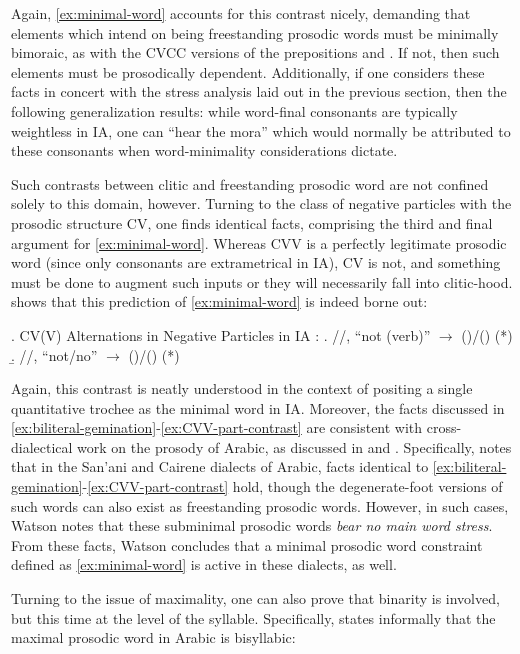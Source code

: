 \documentclass[12pt,twoside,letterpaper]{article}
\begin{document}
Again, \ref{ex:minimal-word} accounts for this contrast nicely, demanding that elements which intend on being freestanding prosodic words must be minimally bimoraic, as with the CVCC versions of the prepositions {\em {}} and {\em {}}. If not, then such elements must be prosodically dependent. Additionally, if one considers these facts in concert with the stress analysis laid out in the previous section, then the following generalization results: while word-final consonants are typically weightless in IA, one can ``hear the mora'' which would normally be attributed to these consonants when word-minimality considerations dictate.

Such contrasts between clitic and freestanding prosodic word are not confined solely to this domain, however. Turning to the class of negative particles with the prosodic structure CV, one finds identical facts, comprising the third and final argument for \ref{ex:minimal-word}. Whereas CVV is a perfectly legitimate prosodic word (since only consonants are extrametrical in IA), CV is not, and something must be done to augment such inputs or they will necessarily fall into clitic-hood. \Next shows that this prediction of \ref{ex:minimal-word} is indeed borne out:

\ex. \label{ex:CVV-part-contrast}CV(V) Alternations in Negative Particles in IA \citep[329--32]{erwin04}:
\a. //, ``not (verb)'' $\rightarrow$ ()/() (*)
\b. //, ``not/no'' $\rightarrow$ ()/() (*)

Again, this contrast is neatly understood in the context of positing a single quantitative trochee as the minimal word in IA. Moreover, the facts discussed in \ref{ex:biliteral-gemination}-\ref{ex:CVV-part-contrast} are consistent with cross-dialectical work on the prosody of Arabic, as discussed in \cite{mccarthy90} and \cite[p.88--90]{watson02}. Specifically, \cite{watson02} notes that in the San'ani and Cairene dialects of Arabic, facts identical to \ref{ex:biliteral-gemination}-\ref{ex:CVV-part-contrast} hold, though the degenerate-foot versions of such words can also exist as freestanding prosodic words. However, in such cases, Watson notes that these subminimal prosodic words \emph{bear no main word stress}. From these facts, Watson concludes that a minimal prosodic word constraint defined as \ref{ex:minimal-word} is active in these dialects, as well.

Turning to the issue of maximality, one can also prove that binarity is involved, but this time at the level of the syllable. Specifically, \Next states informally that the maximal prosodic word in Arabic is bisyllabic:
\end{document}
